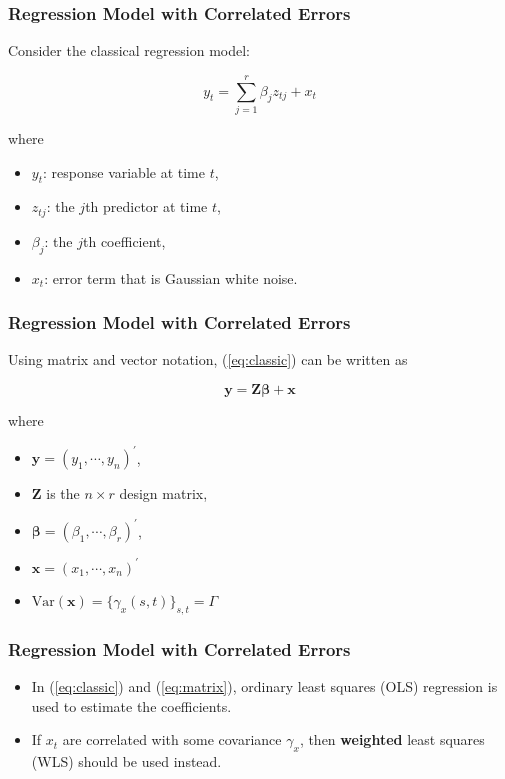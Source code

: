 \documentclass[%
xcolor=pdftex]{beamer}
\begin{document}
\begin{frame}
\frametitle{Regression Model with Correlated Errors}

Consider the classical regression model:

\begin{equation} \label{eq:classic}
y_t = \sum_{j=1}^r \beta_j z_{tj} + x_t
\end{equation}

where

\begin{itemize}
\item $y_t$: response variable at time $t$,
\item $z_{tj}$: the $j$th predictor at time $t$,
\item $\beta_j$: the $j$th coefficient,
\item $x_t$: error term that is Gaussian white noise.
\end{itemize}

\end{frame}



\begin{frame}
\frametitle{Regression Model with Correlated Errors}

Using matrix and vector notation, (\ref{eq:classic}) can be written as

\begin{equation} \label{eq:matrix}
\boldsymbol{y} = \boldsymbol{Z \beta} + \boldsymbol{x}
\end{equation}

where

\begin{itemize}
\item $\boldsymbol{y} = (y_1, \cdots, y_n)^\prime$,
\item $\boldsymbol{Z}$ is the $n \times r$ design matrix,
\item $\boldsymbol{\beta} = (\beta_1, \cdots, \beta_r)^\prime$,
\item $\boldsymbol{x} = (x_1, \cdots, x_n)^\prime$
\item $\text{Var}(\boldsymbol{x}) = \{\gamma_x(s,t) \}_{s,t} = \Gamma$
\end{itemize}

\end{frame}

\begin{frame}
\frametitle{Regression Model with Correlated Errors}

\begin{itemize}
\item In (\ref{eq:classic}) and (\ref{eq:matrix}), ordinary least squares (OLS) regression is used to estimate the coefficients.
\item If $x_t$ are correlated with some covariance $\gamma_x$, then \textbf{weighted} least squares (WLS) should be used instead.
\end{itemize}


\end{frame}
\end{document}
